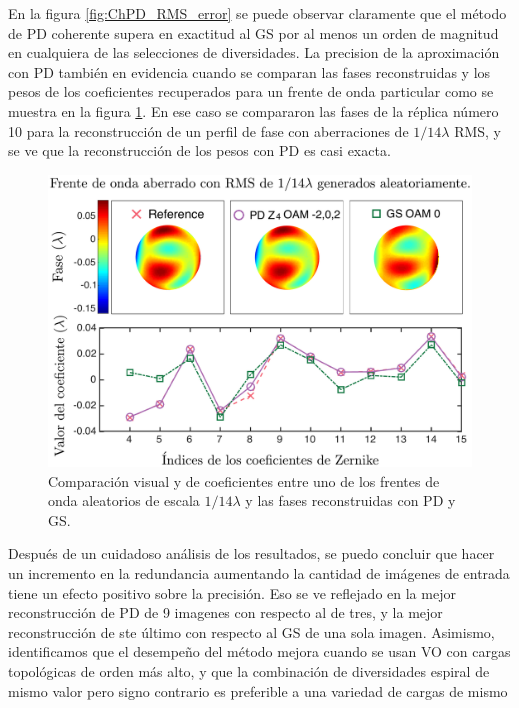 En la figura \ref{fig:ChPD_RMS_error} se puede observar claramente que
el método de PD coherente supera en 
exactitud al GS por al menos un orden de magnitud en cualquiera de las
selecciones de diversidades. La precision de la aproximación con PD
también en evidencia cuando se comparan las fases reconstruidas y los pesos
de los coeficientes recuperados para un frente de onda particular como
se muestra en la figura \ref{fig:ChPD_visual_comparison}. En ese caso se
compararon las fases de la réplica número 10 para la reconstrucción de
un perfil de fase con aberraciones de $1/14\lambda$ RMS, y se ve
que la reconstrucción de los pesos con PD es casi exacta. 
\begin{figure}[h!]
\centering
\includegraphics[scale=.3]{phase_comparison_esp.pdf}
\caption[Resultados visuales de simulaciones de PD coherente para
aberración $1/14\lambda$]{Comparación visual y de coeficientes entre uno de los frentes
  de onda aleatorios de escala $1/14\lambda$ y las fases reconstruidas
  con PD y GS.} 
\label{fig:ChPD_visual_comparison}
\end{figure}
Después de un cuidadoso análisis de los resultados, se puedo concluir que hacer un
incremento en la redundancia aumentando la cantidad de imágenes de
entrada tiene un efecto positivo sobre la precisión. Eso se ve
reflejado en la mejor reconstrucción de PD de 9 imagenes con respecto
al de tres, y la mejor reconstrucción de ste último con respecto al GS
de una sola imagen.  Asimismo, identificamos que el desempeño del
método mejora cuando se usan VO con cargas topológicas de orden más
alto, y que la combinación de diversidades espiral de mismo valor pero
signo contrario es preferible a una variedad de cargas de mismo

